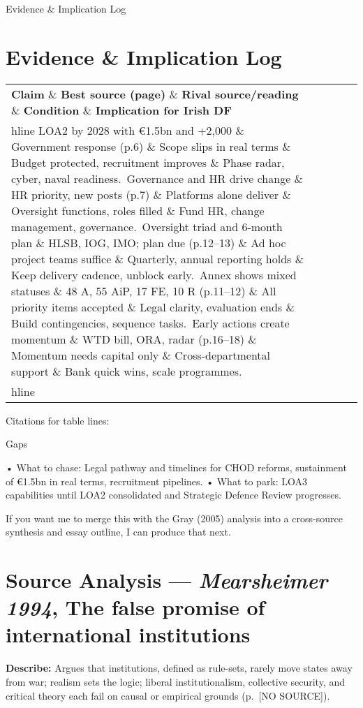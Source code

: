 Evidence \& Implication Log


\section*{Evidence \& Implication Log}
\begin{tabular}{p{3.2cm}p{4.2cm}p{3.6cm}p{3.2cm}p{4.2cm}}
	\textbf{Claim} \& \textbf{Best source (page)} \& \textbf{Rival source/reading} \& \textbf{Condition} \& \textbf{Implication for Irish DF}\\hline
	LOA2 by 2028 with €1.5bn and +2,000 \& Government response (p.6) \& Scope slips in real terms \& Budget protected, recruitment improves \& Phase radar, cyber, naval readiness.\
	Governance and HR drive change \& HR priority, new posts (p.7) \& Platforms alone deliver \& Oversight functions, roles filled \& Fund HR, change management, governance.\
	Oversight triad and 6-month plan \& HLSB, IOG, IMO; plan due (p.12–13) \& Ad hoc project teams suffice \& Quarterly, annual reporting holds \& Keep delivery cadence, unblock early.\
	Annex shows mixed statuses \& 48 A, 55 AiP, 17 FE, 10 R (p.11–12) \& All priority items accepted \& Legal clarity, evaluation ends \& Build contingencies, sequence tasks.\
	Early actions create momentum \& WTD bill, ORA, radar (p.16–18) \& Momentum needs capital only \& Cross-departmental support \& Bank quick wins, scale programmes.\\hline
\end{tabular}

Citations for table lines:

Gaps

• What to chase: Legal pathway and timelines for CHOD reforms, sustainment of €1.5bn in real terms, recruitment pipelines.
• What to park: LOA3 capabilities until LOA2 consolidated and Strategic Defence Review progresses.

If you want me to merge this with the Gray (2005) analysis into a cross-source synthesis and essay outline, I can produce that next.

\parencite{MEARSHEIMER_1994}



	\section*{Source Analysis — \textit{Mearsheimer 1994}, The false promise of international institutions}
	\textbf{Describe:} Argues that institutions, defined as rule-sets, rarely move states away from war; realism sets the logic; liberal institutionalism, collective security, and critical theory each fail on causal or empirical grounds (p.~[NO SOURCE]). 
	
